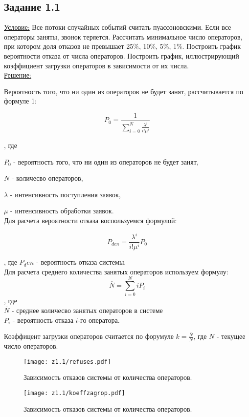 \subsection*{Задание 1.1}

\underline{Условие:} Все потоки случайных событий считать пуассоновскими. Если все операторы заняты, звонок теряется. Рассчитать минимальное число операторов, при котором доля отказов не превышает 25\%, 10\%, 5\%, 1\%.
Построить график вероятности отказа от числа операторов. Построить график, иллюстрирующий коэффициент загрузки операторов в зависимости от их числа.
\\

\underline{Решение:}

Вероятность того, что ни один из операторов не будет занят, рассчитывается по формуле 1:

\begin{equation}
    P_0 = \frac{1}{\sum_{i=0}^N \frac{\lambda^i}{i! \mu^i}}
\end{equation}

, где

$P_0$ - вероятность того, что ни один из операторов не будет занят, 

$N$ - количесво операторов,

$\lambda$ - интенсивность поступления заявок, 

$\mu$ - интенсивность обработки заявок.
\\

Для расчета вероятности отказа воспользуемся формулой:

\begin{equation}
    P_{den} = \frac{\lambda^i}{i! \mu^i}P_0
\end{equation}

, где $P_den$ - вероятность отказа системы.
\\


Для расчета среднего количества занятых операторов используем формулу: 
\begin{equation}
    \overline{N} = \sum_{i=0}^N i P_i
\end{equation},
где \\ $\overline{N}$ - среднее количесво занятых операторов в системе\\
$P_i$ - вероятность отказа $i$-го оператора. 

Коэффицент загрузки операторов считается по форумуле 
$k = \frac{\overline{N}}{N}$, где $N$ - текущее число операторов.

\begin{figure}[h!]
    \centering
    \texttt{[image: z1.1/refuses.pdf]}
    \caption{Зависимость отказов системы от количества операторов.}
\end{figure}

\begin{figure}[h!]
    \centering
    \texttt{[image: z1.1/koeffzagrop.pdf]}
    \caption{Зависимость отказов системы от количества операторов.}
\end{figure}